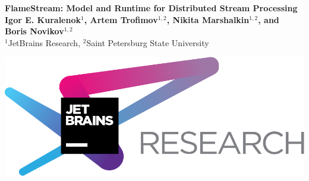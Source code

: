 \documentclass[a0,landscape]{a0poster}
\newcommand {\FlameStream} {FlameStream}
\begin{document}
\begin{minipage}[b]{0.83\linewidth}
  {\veryHuge \color{NavyBlue} \textbf{\FlameStream: Model and Runtime for Distributed Stream Processing}}\\
  \bigbreak
  {\huge \textbf{Igor E. Kuralenok$^1$, Artem Trofimov$^{1,2}$, Nikita Marshalkin$^{1,2}$, and Boris Novikov$^{1,2}$}}\\
  \bigbreak
  {\huge $^1$JetBrains Research, $^2$Saint Petersburg State University}
\end{minipage}
%
\begin{minipage}[b]{0.17\linewidth}
  \includegraphics[width=20cm]{pics/jetbrains.png} 
\end{minipage}

\vspace{1cm} 
\end{document}
